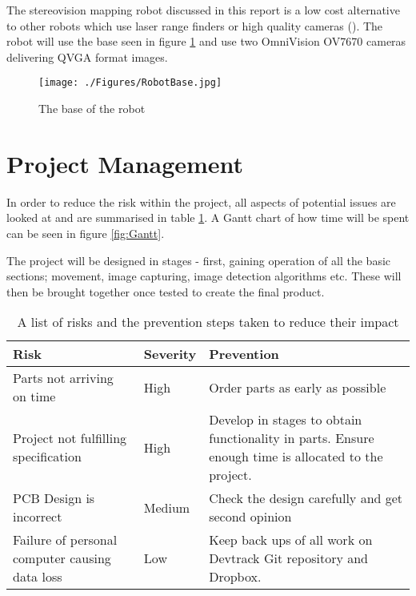 The stereovision mapping robot discussed in this report is a low cost alternative to other robots which use laser range finders or high quality cameras (\cite{Se:MappingRobot}). The robot will use the base seen in figure \ref{fig:RobotBase} and use two OmniVision OV7670 cameras delivering QVGA format images.

\begin{figure}
\texttt{[image: ./Figures/RobotBase.jpg]}
\caption{The base of the robot}
\label{fig:RobotBase}
\end{figure}

\section{Project Management}
In order to reduce the risk within the project, all aspects of potential issues are looked at and are summarised in table \ref{tab:risk}. A Gantt chart of how time will be spent can be seen in figure \ref{fig:Gantt}. 

The project will be designed in stages - first, gaining operation of all the basic sections; movement, image capturing, image detection algorithms etc. These will then be brought together once tested to create the final product. 
\begin{table}
\begin{tabular}{|p{6cm}|p{2cm}|p{6cm}|}\hline
Risk						&	Severity	&	Prevention \\ \hline
Parts not arriving on time	&	High		&	Order parts as early as possible \\
Project not fulfilling specification				&	High		&	Develop in stages to obtain functionality in parts. Ensure enough time is allocated to the project.	\\
PCB Design is incorrect		&	Medium		&	Check the design carefully and get second opinion \\
Failure of personal computer causing data loss & Low	& 	Keep back ups of all work on Devtrack Git repository and Dropbox.\\

\hline
\end{tabular}
\caption{A list of risks and the prevention steps taken to reduce their impact}
\label{tab:risk}
\end{table}
